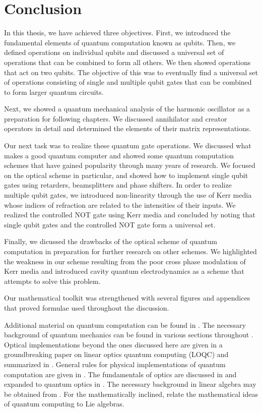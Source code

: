 \chapter{Conclusion\label{ch:conc}}

In this thesis, we have achieved three objectives. First, we introduced the fundamental elements of quantum computation known as qubits. Then, we defined operations on individual qubits and discussed a universal set of operations that can be combined to form all others. We then showed operations that act on two qubits. The objective of this was to eventually find a universal set of operations consisting of single and multiple qubit gates that can be combined to form larger quantum circuits.

Next, we showed a quantum mechanical analysis of the harmonic oscillator as a preparation for following chapters. We discussed annihilator and creator operators in detail and determined the elements of their matrix representations.

Our next task was to realize these quantum gate operations. We discussed what makes a good quantum computer and showed some quantum computation schemes that have gained popularity through many years of research. We focused on the optical scheme in particular, and showed how to implement single qubit gates using retarders, beamsplitters and phase shifters. In order to realize multiple qubit gates, we introduced non-linearity through the use of Kerr media whose indices of refraction are related to the intensities of their inputs. We realized the controlled NOT gate using Kerr media and concluded by noting that single qubit gates and the controlled NOT gate form a universal set.

Finally, we dicussed the drawbacks of the optical scheme of quantum computation in preparation for further research on other schemes. We highlighted the weakness in our scheme resulting from the poor cross phase modulation of Kerr media and introduced cavity quantum electrodynamics as a scheme that attempts to solve this problem.

Our mathematical toolkit was strengthened with several figures and appendices that proved formulae used throughout the discussion.

Additional material on quantum computation can be found in \cite{nielsen2000}. The necessary background of quantum mechanics can be found in various sections throughout \cite{griffiths}. Optical implementations beyond the ones discussed here are given in a groundbreaking paper on linear optics quantum computing (LOQC) \cite{klm} and summarized in \cite{myers-2005,knill-2000,knill-2002,knill-2002-postsel}. General rules for physical implementations of quantum computation are given in \cite{divincenzo}. The fundamentals of optics are discussed in \cite{hechtoptics} and expanded to quantum optics in \cite{foxqoptics}. The necessary background in linear algebra may be obtained from \cite{linalg}. For the mathematically inclined, \cite{liealgs,liealgs2,liealgs3} relate the mathematical ideas of quantum computing to Lie algebras. 
